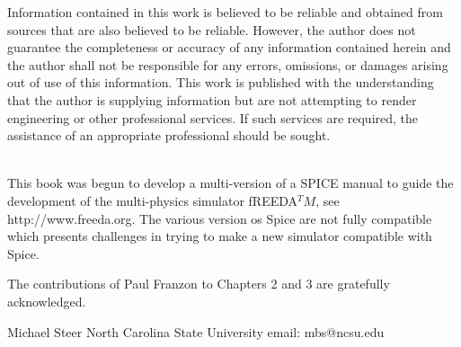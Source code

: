 {\scriptsize \baselineskip=6pt
\noindent Information contained in this work is believed to be reliable and
obtained from sources that are also believed to be reliable.
However, the author does not guarantee the completeness or
accuracy of any information contained herein and the author shall not be responsible for any errors, omissions, or damages
arising out of use of this information.
This work is published with the understanding that the
author is supplying information but are not attempting to render
engineering or other professional services. If such
services are required, the assistance of an appropriate professional should
be sought.}
\hspace*{\fill}
\tableofcontents
\listoffigures
\listoftables
%
\clearpage
\vspace*{0.5in}
\\[0.5in]
This book was begun to develop a multi-version of a SPICE manual to guide the development of the multi-physics simulator fREEDA$^TM$, see http://www.freeda.org. The various version os Spice are not fully compatible which presents challenges in trying to make a new simulator compatible with Spice.


The contributions of Paul Franzon to Chapters 2 and 3 are gratefully acknowledged.\\[0.5in]


\parbox{2in}{Michael Steer\newline
North Carolina State University\newline
email: mbs@ncsu.edu}
